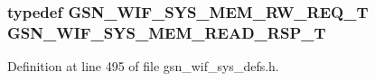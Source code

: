 \label{a00612_a471b870bb57e6c8f0723e15c1bdebc59}
\hypertarget{a00612_a84498c5c575611f447294242aea8a874}{
\subsubsection[{GSN\_\-WIF\_\-SYS\_\-MEM\_\-READ\_\-RSP\_\-T}]{\setlength{\rightskip}{0pt plus 5cm}typedef {\bf GSN\_\-WIF\_\-SYS\_\-MEM\_\-RW\_\-REQ\_\-T} {\bf GSN\_\-WIF\_\-SYS\_\-MEM\_\-READ\_\-RSP\_\-T}}}
\label{a00612_a84498c5c575611f447294242aea8a874}


Definition at line 495 of file gsn\_\-wif\_\-sys\_\-defs.h.

